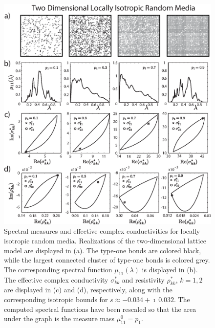 \documentclass{cmslatex}
\begin{document}
%
\begin{figure}[t]
  \centerline{\includegraphics[scale=0.75]{A_Locally_Isotropic_RRN_11.eps}}
\caption{Spectral measures and effective complex conductivities for
  locally isotropic random media. Realizations of the two-dimensional
  lattice model are displayed in (a). The type-one bonds are colored
  black, while the largest connected cluster of type-one bonds is
  colored grey. The corresponding spectral function $\mu_{11}(\lambda)$ is
  displayed in (b). The effective complex conductivity $\sigma^*_{kk}$ and
  resistivity $\rho^*_{kk}$, $k=1,2$ are displayed in (c) and (d),
  respectively, along with the corresponding isotropic bounds for
  $s\approx-0.034+\imath\,0.032$. The computed spectral functions have been
  rescaled so that the area under the graph is the measure mass
  $\mu^0_{11}=p_1$.    
        } 
\label{fig:LocIsotropic_RRN_11}
\end{figure}
%


   
\end{document}
